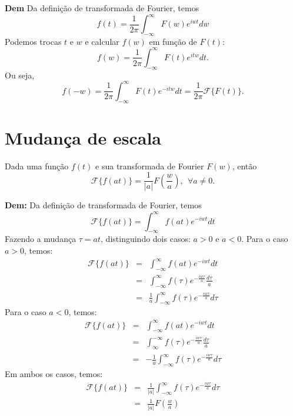 \documentclass[a4paper,10pt]{book}
\begin{document}
{\bf Dem} Da definição de transformada de Fourier, temos
 \begin{equation}
 f(t)=\frac{1}{2\pi}\int_{-\infty}^{\infty} F(w)e^{iwt}dw
 \end{equation}
 Podemos trocas $t$ e $w$ e calcular $f(w)$ em função de $F(t)$:
 \begin{equation}
 f(w)=\frac{1}{2\pi}\int_{-\infty}^{\infty} F(t)e^{itw}dt.
 \end{equation}
 Ou seja, 
 \begin{equation}
 f(-w)=\frac{1}{2\pi}\int_{-\infty}^{\infty} F(t)e^{-itw}dt=\frac{1}{2\pi}\mathcal{F}\{F(t)\}.
 \end{equation}

 \section{Mudança de escala}\label{prop_mud_esc} Dada uma função $f(t)$ e sua transformada de Fourier $F(w)$, então 
 \begin{equation}
 \mathcal{F}\{f(at)\}=\frac{1}{|a|}F\left(\frac{w}{a}\right),~~ \forall a\neq 0.
 \end{equation}

{\bf Dem:} Da definição de transformada de Fourier, temos
 \begin{equation}
 \mathcal{F}\{f(at)\}=\int_{-\infty}^{\infty} f(at)e^{-iwt}dt
 \end{equation}
 Fazendo a mudança $\tau= a t$, distinguindo dois casos: $a>0$ e $a<0$.
 Para o caso $a>0$, temos:
 \begin{eqnarray*}
 \mathcal{F}\{f(at)\}&=&\int_{-\infty}^{\infty} f(at)e^{-iwt}dt\\
 &=&\int_{-\infty}^{\infty} f(\tau)e^{-\frac{iw\tau}{a}}\frac{d\tau}{a}\\
 &=&\frac{1}{a}\int_{-\infty}^{\infty} f(\tau)e^{-\frac{iw\tau}{a}}d\tau
 \end{eqnarray*}
 Para o caso $a<0$, temos:
 \begin{eqnarray*}
 \mathcal{F}\{f(at)\}&=&\int_{-\infty}^{\infty} f(at)e^{-iwt}dt\\
 &=&\int_{\infty}^{-\infty} f(\tau)e^{-\frac{iw\tau}{a}}\frac{d\tau}{a}\\
 &=&-\frac{1}{a}\int_{-\infty}^{\infty} f(\tau)e^{-\frac{iw\tau}{a}}d\tau
 \end{eqnarray*}
 Em ambos os casos, temos:
 \begin{eqnarray*}
 \mathcal{F}\{f(at)\}&=&\frac{1}{|a|}\int_{-\infty}^{\infty} f(\tau)e^{-\frac{iw\tau}{a}}d\tau\\
 &=&\frac{1}{|a|}F\left(\frac{w}{a}\right)
 \end{eqnarray*}
\end{document}
